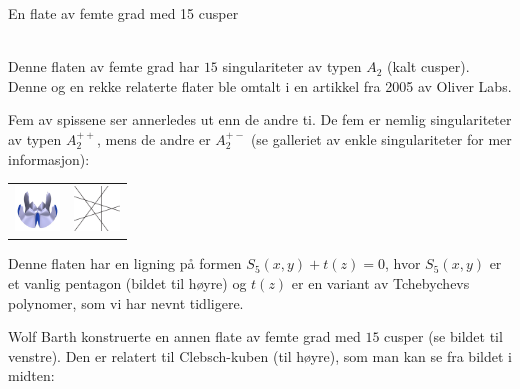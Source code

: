 \documentclass[no]{./../../common/SurferDesc}%
\begin{document}
\footnotesize




\begin{surferPage}
  \begin{surferTitle}En flate av femte grad med 15 cusper\end{surferTitle}   \\
  
  Denne flaten av femte grad har $15$ singulariteter av typen $A_2$ (kalt cusper). 
  Denne og en rekke relaterte flater ble omtalt i en artikkel fra 2005 av Oliver Labs. 

Fem av spissene ser annerledes ut enn de andre ti. De fem er nemlig singulariteter av 
typen $A_2^{++}$, mens de andre er $A_2^{+-}$ (se galleriet av enkle singulariteter for mer informasjon): 

     \vspace*{-0.3em}
    \begin{center}
      \begin{tabular}{c@{\qquad}c}
        \includegraphics[height=1.2cm]{./../../common/images/dessins_quint_15a2}
        &
        \includegraphics[height=1.2cm]{./../../common/images/rp5.pdf}
      \end{tabular}
    \end{center}
    \vspace*{-0.3em}    
    
	Denne flaten har en ligning på formen $S_5(x,y) + t(z)=0$, hvor $S_5(x,y)$ er et vanlig pentagon 
	(bildet til høyre) og $t(z)$ er en variant av Tchebychevs polynomer, som vi har nevnt tidligere. 
    
	
	Wolf Barth konstruerte en annen flate av femte grad med $15$ cusper (se bildet til venstre). 
	Den er relatert til Clebsch-kuben (til høyre), som man kan se fra bildet i midten:



\end{surferPage}
\end{document}
